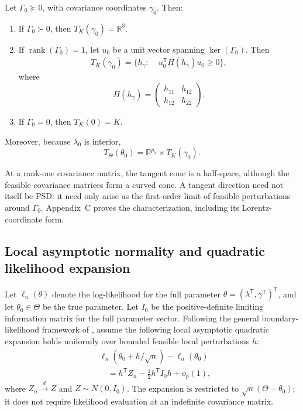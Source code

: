 \begin{proposition}\label{prop:sec4-tangent-cones}
Let $\Gamma_0\succeq0$, with covariance coordinates $\gamma_0$. Then:
\begin{enumerate}
\item If $\Gamma_0\succ0$, then $T_K(\gamma_0)=\mathbb R^3$.
\item If $\operatorname{rank}(\Gamma_0)=1$, let $u_0$ be a unit vector spanning $\ker(\Gamma_0)$. Then
\begin{equation}\label{eq:sec4-rankone-tangent}
\begin{aligned}
T_K(\gamma_0)=\{h_\gamma:\;&u_0^{\mathsf T}
H(h_\gamma)u_0\geq0\},
\end{aligned}
\end{equation}
where
\[
H(h_\gamma)=
\begin{pmatrix}
h_{11}&h_{12}\\
h_{12}&h_{22}
\end{pmatrix}.
\]
\item If $\Gamma_0=0$, then $T_K(0)=K$.
\end{enumerate}
Moreover, because $\lambda_0$ is interior,
\begin{equation}\label{eq:sec4-full-tangent}
T_\Theta(\theta_0)
=\mathbb R^{p_\lambda}\times T_K(\gamma_0).
\end{equation}
\end{proposition}
At a rank-one covariance matrix, the tangent cone is a half-space, although the feasible covariance matrices form a curved cone. A tangent direction need not itself be PSD: it need only arise as the first-order limit of feasible perturbations around $\Gamma_0$. Appendix~C proves the characterization, including its Lorentz-coordinate form.

\subsection{Local asymptotic normality and quadratic likelihood expansion}
\label{subsec:lan}
Let $\ell_n(\theta)$ denote the log-likelihood for the full parameter $\theta=(\lambda^{\mathsf T},\gamma^{\mathsf T})^{\mathsf T}$, and let $\theta_0\in\Theta$ be the true parameter. Let $I_0$ be the positive-definite limiting information matrix for the full parameter vector. Following the general boundary-likelihood framework of \citet{self1987asymptotic}, assume the following local asymptotic quadratic expansion holds uniformly over bounded feasible local perturbations $h$:
\begin{equation}\label{eq:sec4-lan}
\begin{aligned}
&\ell_n(\theta_0+h/\sqrt n)-\ell_n(\theta_0)\\
&\quad=h^{\mathsf T}Z_n
-\tfrac12h^{\mathsf T}I_0h+o_p(1),
\end{aligned}
\end{equation}
where $Z_n\xrightarrow{d}Z$ and $Z\sim N(0,I_0)$. The expansion is restricted to $\sqrt n(\Theta-\theta_0)$; it does not require likelihood evaluation at an indefinite covariance matrix.


